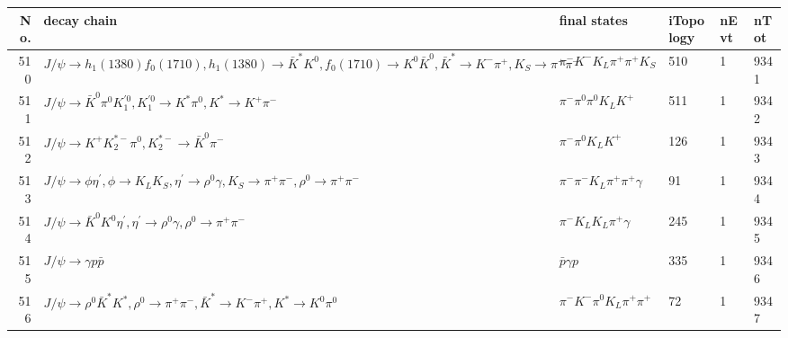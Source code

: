 \begin{table}[htbp] 
\begin{center}
\begin{small}
\begin{tabular}{rlllll}\hline\hline
 No. & decay chain & final states &  iTopology & nEvt & nTot \\\hline
510&$J/\psi       \rightarrow h_{1}(1380)    f_{0}(1710)    , h_{1}(1380)     \rightarrow \bar{K}^{*}   K^{0}          , f_{0}(1710)     \rightarrow K^{0}          \bar{K}^{0}   , \bar{K}^{*}    \rightarrow K^{-}          \pi^{+}        , K_{S}           \rightarrow \pi^{+}        \pi^{-}        $&$\pi^{-}        K^{-}          K_{L}          \pi^{+}        \pi^{+}        K_{S}          $&  510&    1& 9341\\
511&$J/\psi       \rightarrow \bar{K}^{0}   \pi^{0}        K_1^{'0}      , K_1^{'0}       \rightarrow K^{*}          \pi^{0}        , K^{*}           \rightarrow K^{+}          \pi^{-}        $&$\pi^{-}        \pi^{0}        \pi^{0}        K_{L}          K^{+}          $&  511&    1& 9342\\
512&$J/\psi       \rightarrow K^{+}          K_2^{*-}       \pi^{0}        , K_2^{*-}        \rightarrow \bar{K}^{0}   \pi^{-}        $&$\pi^{-}        \pi^{0}        K_{L}          K^{+}          $&  126&    1& 9343\\
513&$J/\psi       \rightarrow \phi           \eta^{\prime} , \phi            \rightarrow K_{L}          K_{S}          , \eta^{\prime}  \rightarrow \rho^{0}      \gamma       , K_{S}           \rightarrow \pi^{+}        \pi^{-}        , \rho^{0}       \rightarrow \pi^{+}        \pi^{-}        $&$\pi^{-}        \pi^{-}        K_{L}          \pi^{+}        \pi^{+}        \gamma       $&   91&    1& 9344\\
514&$J/\psi       \rightarrow \bar{K}^{0}   K^{0}          \eta^{\prime} , \eta^{\prime}  \rightarrow \rho^{0}      \gamma       , \rho^{0}       \rightarrow \pi^{+}        \pi^{-}        $&$\pi^{-}        K_{L}          K_{L}          \pi^{+}        \gamma       $&  245&    1& 9345\\
515&$J/\psi       \rightarrow \gamma       p                 \bar{p}          $&$\bar{p}          \gamma       p                 $&  335&    1& 9346\\
516&$J/\psi       \rightarrow \rho^{0}      \bar{K}^{*}   K^{*}          , \rho^{0}       \rightarrow \pi^{+}        \pi^{-}        , \bar{K}^{*}    \rightarrow K^{-}          \pi^{+}        , K^{*}           \rightarrow K^{0}          \pi^{0}        $&$\pi^{-}        K^{-}          \pi^{0}        K_{L}          \pi^{+}        \pi^{+}        $&   72&    1& 9347\\

\end{tabular}
\end{small}
\end{center}
\end{table}
